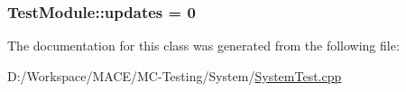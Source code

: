 \subsubsection[{\texorpdfstring{updates}{updates}}]{ Test\+Module\+::updates = 0}\hypertarget{class_test_module_a73f9b41d990edf8c2b38520e415d1e93}{}\label{class_test_module_a73f9b41d990edf8c2b38520e415d1e93}


The documentation for this class was generated from the following file\+:\begin{DoxyCompactItemize}
\item 
D\+:/\+Workspace/\+M\+A\+C\+E/\+M\+C-\/\+Testing/\+System/\hyperlink{_system_test_8cpp}{System\+Test.\+cpp}\end{DoxyCompactItemize}
